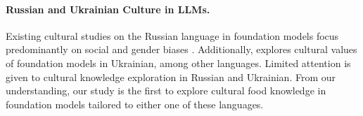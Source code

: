 \paragraph{Russian and Ukrainian Culture in LLMs.} 
Existing cultural studies on the Russian language in foundation models focus predominantly on social and gender biases \cite{grigoreva2024rubia, km, li2024uncoveringdifferencespersuasivelanguage}. Additionally, \citet{kharchenko2024llmsrepresentvaluescultures} explores cultural values of foundation models in Ukrainian, among other languages. Limited attention is given to cultural knowledge exploration in Russian and Ukrainian. From our understanding, our study is the first to explore cultural food knowledge in foundation models tailored to either one of these languages.